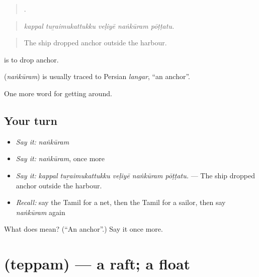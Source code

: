 \begin{quote}
    .
\end{quote}

\begin{quote}
\emph{kappal tuṟaimukattukku veḷiyē naṅkūram pōṭṭatu.}
\end{quote}

\begin{quote}
The ship dropped anchor outside the harbour.
\end{quote}

  is to drop anchor.

\begin{cousinweb}
\textbf{} (\emph{naṅkūram}) is usually traced to Persian \emph{langar}, \textquotedblleft{}an anchor\textquotedblright{}.
\end{cousinweb}

\begin{grammarlens}[title={What you've built}]
One more word for getting around.
\end{grammarlens}

\subsection*{Your turn}
\begin{itemize}
\raggedright
  \item \emph{Say it:} \emph{naṅkūram}
  \item \emph{Say it:} \emph{naṅkūram}, once more
  \item \emph{Say it:} \emph{kappal tuṟaimukattukku veḷiyē naṅkūram pōṭṭatu.} — The ship dropped anchor outside the harbour.
  \item \emph{Recall:} say the Tamil for a net, then the Tamil for a sailor, then say \emph{naṅkūram} again
\end{itemize}

\begin{tcolorbox}[breakable,colback=teal!4,colframe=teal!35!black,title={Before you move on}]
What does  mean? (\textquotedblleft{}An anchor\textquotedblright{}.) Say it once more.
\end{tcolorbox}
\section[\texorpdfstring{\ta{தெப்பம்} (teppam)}{தெப்பம் (teppam)}]{ (teppam) — a raft; a float}

